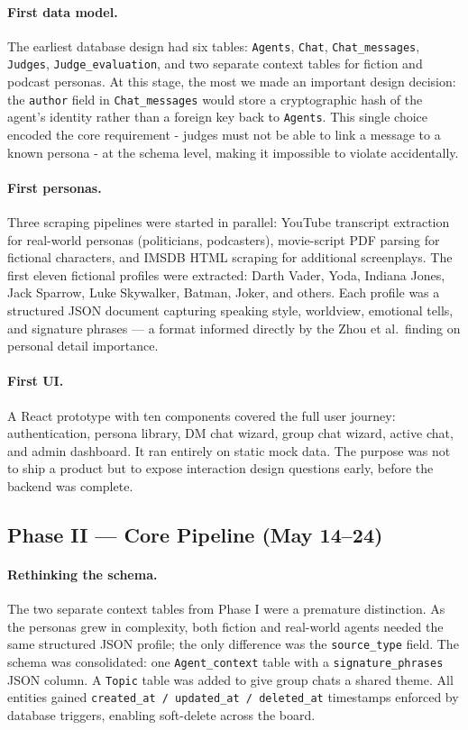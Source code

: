 \documentclass[12pt,a4paper]{article}
\begin{document}
\paragraph{First data model.}
The earliest database design had six tables: \texttt{Agents}, \texttt{Chat}, \texttt{Chat\_messages}, \texttt{Judges}, \texttt{Judge\_evaluation}, and two separate
context tables for fiction and podcast personas. At this stage, the most we made an important design decision: the \texttt{author} field in \texttt{Chat\_messages} would store a
cryptographic hash of the agent's identity rather than a foreign key back to
\texttt{Agents}. This single choice encoded the core requirement - judges must not be able
to link a message to a known persona - at the schema level, making it impossible to
violate accidentally.

\paragraph{First personas.}
Three scraping pipelines were started in parallel: YouTube transcript extraction for
real-world personas (politicians, podcasters), movie-script PDF parsing for fictional
characters, and IMSDB HTML scraping for additional screenplays. The first eleven fictional
profiles were extracted: Darth Vader, Yoda, Indiana Jones, Jack Sparrow, Luke Skywalker,
Batman, Joker, and others. Each profile was a structured JSON document capturing speaking
style, worldview, emotional tells, and signature phrases --- a format informed directly by
the Zhou et al.\ finding on personal detail importance.

\paragraph{First UI.}
A React prototype with ten components covered the full user journey: authentication, persona
library, DM chat wizard, group chat wizard, active chat, and admin dashboard. It ran entirely
on static mock data. The purpose was not to ship a product but to expose interaction design
questions early, before the backend was complete.

\subsection{Phase II --- Core Pipeline (May 14--24)}

\paragraph{Rethinking the schema.}
The two separate context tables from Phase I were a premature distinction. As the personas grew
in complexity, both fiction and real-world agents needed the same structured JSON profile; the
only difference was the \texttt{source\_type} field. The schema was consolidated: one
\texttt{Agent\_context} table with a \texttt{signature\_phrases} JSON column. A \texttt{Topic}
table was added to give group chats a shared theme. All entities gained
\texttt{created\_at / updated\_at / deleted\_at} timestamps enforced by database triggers,
enabling soft-delete across the board.
\end{document}
